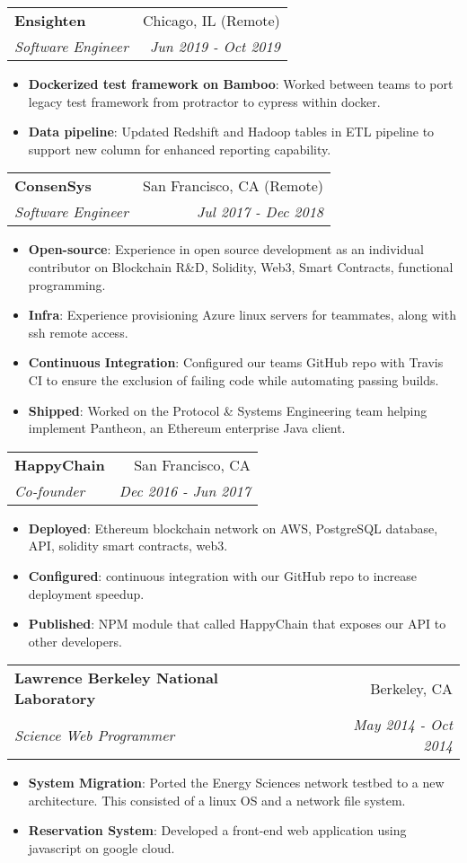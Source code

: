 \documentclass[letterpaper,11pt]{article}
\makeatletter
\newcommand{\resumeItem}[2]{
  \item\small{
    \textbf{#1}{: #2 \vspace{-2pt}}
  }
}
\newcommand{\resumeSubheading}[4]{
  \vspace{-1pt}\item
    \begin{tabular*}{0.97\textwidth}[t]{l@{\extracolsep{\fill}}r}
      \textbf{#1} & #2 \\
      \textit{\small#3} & \textit{\small #4} \\
    \end{tabular*}\vspace{-5pt}
}
\newcommand{\resumeItemListStart}{\begin{itemize}}
\newcommand{\resumeItemListEnd}{\end{itemize}\vspace{-5pt}}
\makeatother
\begin{document}
    \resumeSubheading
      {Ensighten}{Chicago, IL (Remote)}
      {Software Engineer}{Jun 2019 - Oct 2019}
      \resumeItemListStart
        \resumeItem{Dockerized test framework on Bamboo}
          {Worked between teams to port legacy test framework from protractor to cypress within docker.}
        \resumeItem{Data pipeline}
          {Updated Redshift and Hadoop tables in ETL pipeline to support new column for enhanced reporting capability.}
      \resumeItemListEnd

    \resumeSubheading
      {ConsenSys}{San Francisco, CA (Remote)}
      {Software Engineer}{Jul 2017 - Dec 2018}
      \resumeItemListStart
        \resumeItem{Open-source}
          {Experience in open source development as an individual contributor on Blockchain R\&D, Solidity, Web3, Smart Contracts, functional programming.}
          \resumeItem{Infra}
            {Experience provisioning Azure linux servers for teammates, along with ssh remote access.}
        \resumeItem{Continuous Integration}
          {Configured our teams GitHub repo with Travis CI to ensure the exclusion of failing code while automating passing builds.}

        \resumeItem{Shipped}
          {Worked on the Protocol \& Systems Engineering team helping implement Pantheon, an Ethereum enterprise Java client.}
      \resumeItemListEnd

    \resumeSubheading
      {HappyChain}{San Francisco, CA}
      {Co-founder}{Dec 2016 - Jun 2017}
      \resumeItemListStart
        \resumeItem{Deployed}
          {Ethereum blockchain network on AWS, PostgreSQL database, API, solidity smart contracts, web3.}
        \resumeItem{Configured}
          {continuous integration with our GitHub repo to increase deployment speedup.}
        \resumeItem{Published}
          {NPM module that called HappyChain that exposes our API to other developers.}
       \resumeItemListEnd

    \resumeSubheading
      {Lawrence Berkeley National Laboratory}{Berkeley, CA}
      {Science Web Programmer}{May 2014 - Oct 2014}
      \resumeItemListStart
        \resumeItem{System Migration}
          {Ported the Energy Sciences network testbed to a new architecture. This consisted of a linux OS and a network file system.}
        \resumeItem{Reservation System}
          {Developed a front-end web application using javascript on google cloud.}
       \resumeItemListEnd
\end{document}
